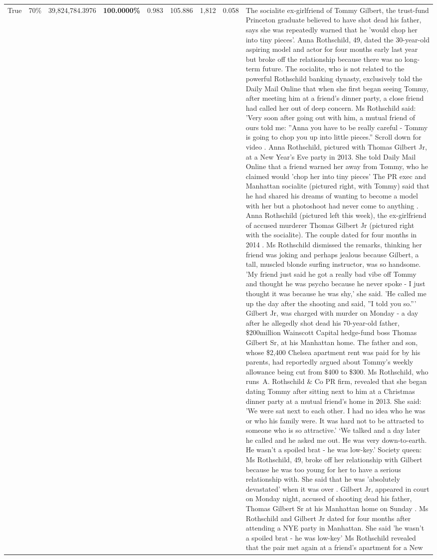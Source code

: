 \begin{table}[H]
\begin{tabular}{lllrlllll}
True & 70\% & 39,824,784.3976 & \bfseries \color{red} 100.0000\% & 0.983 & 105.886 & 1,812 & 0.058 & The socialite ex-girlfriend of Tommy Gilbert, the trust-fund Princeton graduate believed to have shot dead his father, says she was repeatedly warned that he 'would chop her into tiny pieces'. Anna Rothschild, 49, dated the 30-year-old aspiring model and actor for four months early last year but broke off the relationship because there was no long-term future. The socialite, who is not related to the powerful Rothschild banking dynasty, exclusively told the Daily Mail Online that when she first began seeing Tommy, after meeting him at a friend's dinner party, a close friend had called her out of deep concern. Ms Rothschild said: 'Very soon after going out with him, a mutual friend of ours told me: ''Anna you have to be really careful - Tommy is going to chop you up into little pieces.'' Scroll down for video . Anna Rothschild, pictured with Thomas Gilbert Jr, at a New Year's Eve party in 2013. She told Daily Mail Online that a friend warned her away from Tommy, who he claimed would 'chop her into tiny pieces' The PR exec and Manhattan socialite (pictured right, with Tommy) said that he had shared his dreams of wanting to become a model with her but a photoshoot had never come to anything . Anna Rothschild (pictured left this week), the ex-girlfriend of accused murderer Thomas Gilbert Jr (pictured right with the socialite). The couple dated for four months in 2014 . Ms Rothschild dismissed the remarks, thinking her friend was joking and perhaps jealous because Gilbert, a tall, muscled blonde surfing instructor, was so handsome. 'My friend just said he got a really bad vibe off Tommy and thought he was psycho because he never spoke - I just thought it was because he was shy,' she said. 'He called me up the day after the shooting and said, ''I told you so.''' Gilbert Jr, was charged with murder on Monday - a day after he allegedly shot dead his 70-year-old father, \$200million Wainscott Capital hedge-fund boss Thomas Gilbert Sr, at his Manhattan home. The father and son, whose \$2,400 Chelsea apartment rent was paid for by his parents, had reportedly argued about Tommy's weekly allowance being cut from \$400 to \$300. Ms Rothschild, who runs A. Rothschild \& Co PR firm, revealed that she began dating Tommy after sitting next to him at a Christmas dinner party at a mutual friend's home in 2013. She said: 'We were sat next to each other. I had no idea who he was or who his family were. It was hard not to be attracted to someone who is so attractive.' ‘We talked and a day later he called and he asked me out. He was very down-to-earth. He wasn’t a spoiled brat - he was low-key.’ Society queen: Ms Rothschild, 49, broke off her relationship with Gilbert because he was too young for her to have a serious relationship with. She said that he was 'absolutely devastated' when it was over . Gilbert Jr, appeared in court on Monday night, accused of shooting dead his father, Thomas Gilbert Sr at his Manhattan home on Sunday . Ms Rothschild and Gilbert Jr dated for four months after attending a NYE party in Manhattan. She said 'he wasn't a spoiled brat - he was low-key' Ms Rothschild revealed that the pair met again at a friend’s apartment for a New 
\end{tabular}
\end{table}

